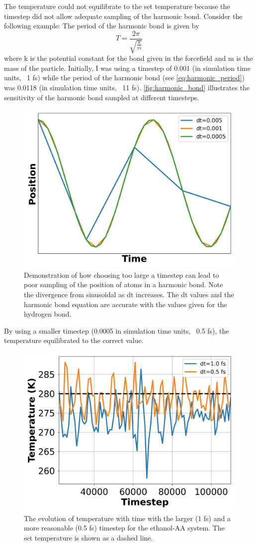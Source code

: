 The temperature could not equilibrate to the set temperature because the timestep did not allow adequate sampling of the harmonic bond.
Consider the following example:
The period of the harmonic bond is given by
\begin{equation}\label{eq:harmonic_period}
    T = \frac{2\pi}{\sqrt{\frac{k}{m}}}
\end{equation}
where k is the potential constant for the bond given in the forcefield and m is the mass of the particle.
Initially, I was using a timestep of 0.001 (in simulation time units, ~1 fs) while the period of the harmonic bond (see \autoref{eq:harmonic_period}) was 0.0118 (in simulation time units, ~11 fs). \autoref{fig:harmonic_bond} illustrates the sensitivity of the harmonic bond sampled at different timesteps.
\begin{figure}[h!]
    \centering
    \includegraphics[width=0.6\linewidth,keepaspectratio]{figures/rep_study/harmonic_bond.png}
    \caption{Demonstration of how choosing too large a timestep can lead to poor sampling of the position of atoms in a harmonic bond. Note the divergence from sinusoidal as dt increases. The dt values and the harmonic bond equation are accurate with the values given for the hydrogen bond.}\label{fig:harmonic_bond}
\end{figure}
By using a smaller timestep (0.0005 in simulation time units, ~0.5 fs), the temperature equilibrated to the correct value.
\begin{figure}[h!]
    \centering
    \includegraphics[width=0.6\linewidth,keepaspectratio]{figures/rep_study/temp_evolution.png}
    \caption{The evolution of temperature with time with the larger (1 fs) and a more reasonable (0.5 fs) timestep for the ethanol-AA system. The set temperature is shown as a dashed line. }\label{fig:temp_evo_ethanol}
\end{figure}
